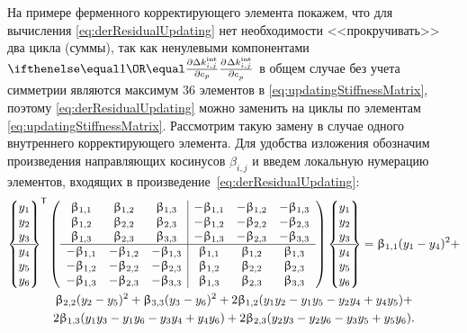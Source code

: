 На примере ферменного корректирующего элемента покажем, что для вычисления \eqref{eq:derResidualUpdating} нет необходимости <<прокручивать>> два цикла (суммы), так как ненулевыми компонентами $ \partDer{\Delta \internal{k}_{i, j}}{c_p}{} $ в общем случае без учета симметрии являются максимум 36 элементов в \eqref{eq:updatingStiffnessMatrix}, поэтому \eqref{eq:derResidualUpdating} можно заменить на циклы по элементам \eqref{eq:updatingStiffnessMatrix}. Рассмотрим такую замену в случае одного внутреннего корректирующего элемента. Для удобства изложения обозначим произведения направляющих косинусов $ \beta_{i, j} $ и введем локальную нумерацию элементов, входящих в произведение~\eqref{eq:derResidualUpdating}:
\begingroup
\allowdisplaybreaks
\begin{gather}
	\trans{
	\begin{Bmatrix}
		y_1 \\
		y_2 \\
		y_3 \\
		\hline
		y_4 \\
		y_5 \\
		y_6 
	\end{Bmatrix}}
	\left(
	\begin{array}{c c c | c c c}
		\beta_{1, 1} & \beta_{1, 2} & \beta_{1, 3} & -\beta_{1, 1} & -\beta_{1, 2} & -\beta_{1, 3} \\
		\beta_{1, 2} & \beta_{2, 2} & \beta_{2, 3} & -\beta_{1, 2} & -\beta_{2, 2} & -\beta_{2, 3} \\
		\beta_{1, 3} & \beta_{2, 3} & \beta_{3, 3} & -\beta_{1, 3} & -\beta_{2, 3} & -\beta_{3, 3} \\
		\hline
		-\beta_{1, 1} & -\beta_{1, 2} & -\beta_{1, 3} & \beta_{1, 1} & \beta_{1, 2} & \beta_{1, 3} \\
		-\beta_{1, 2} & -\beta_{2, 2} & -\beta_{2, 3} & \beta_{1, 2} & \beta_{2, 2} & \beta_{2, 3} \\
		-\beta_{1, 3} & -\beta_{2, 3} & -\beta_{3, 3} & \beta_{1, 3} & \beta_{2, 3} & \beta_{3, 3}
	\end{array}
	\right)
	\begin{Bmatrix}
		y_1 \\
		y_2 \\
		y_3 \\
		\hline
		y_4 \\
		y_5 \\
		y_6 
	\end{Bmatrix} = \beta_{1, 1} (y_1 - y_4) ^ 2 + \nonumber \\
	\beta_{2, 2} (y_2 - y_5) ^ 2 + \beta_{3, 3} (y_3 - y_6) ^ 2 + 2 \beta_{1, 2} (y_1 y_2 - y_1 y_5 - y_2 y_4 + y_4 y_5) + \nonumber \\
	2 \beta_{1, 3} (y_1 y_3 - y_1 y_6 - y_3 y_4 + y_4 y_6) + 2 \beta_{2, 3} (y_2 y_3 - y_2 y_6 - y_3 y_5 + y_5 y_6).
	\label{eq:schemeDerFull}
\end{gather}
\endgroup
 
